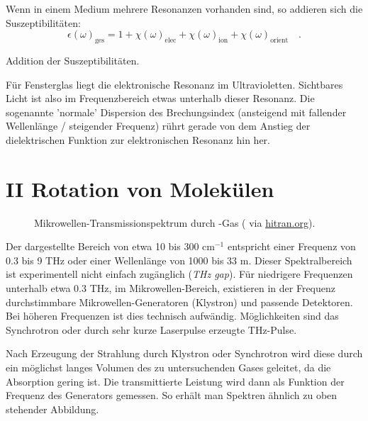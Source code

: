 Wenn in einem Medium mehrere Resonanzen vorhanden sind, so addieren sich die Suszeptibilitäten:
\begin{equation}
\epsilon(\omega)_\text{ges} = 1 + \chi(\omega)_\text{elec} +  \chi(\omega)_\text{ion}  + \chi(\omega)_\text{orient} \quad .
\end{equation}

\begin{marginfigure}

\caption{Addition der Suszeptibilitäten. \label{fig:diel_multiple_lorentz}}
\end{marginfigure}

Für Fensterglas liegt die elektronische Resonanz im Ultravioletten. Sichtbares Licht ist also im Frequenzbereich etwas unterhalb dieser Resonanz. Die sogenannte 'normale' Dispersion des Brechungsindex (ansteigend mit fallender Wellenlänge / steigender Frequenz) rührt gerade von dem Anstieg der dielektrischen Funktion zur elektronischen Resonanz hin her.





\section{II Rotation von Molekülen}




\begin{figure}
\caption{Mikrowellen-Transmissionspektrum durch  -Gas  (\cite{Li_2011_hcl} via \href{https://hitran.org}{hitran.org}).
\label{fig:rot_hcl}}
\end{figure}




Der dargestellte Bereich  von etwa 10 bis 300 cm$^{-1}$ entspricht einer Frequenz von 0.3 bis 9 THz oder einer Wellenlänge von 1000 bis 33 \textmu m. Dieser Spektralbereich ist experimentell nicht einfach zugänglich (\emph{THz gap}). Für niedrigere Frequenzen unterhalb etwa 0.3 THz, im Mikrowellen-Bereich, existieren in der Frequenz durchstimmbare  Mikrowellen-Generatoren (Klystron) und passende Detektoren. Bei höheren Frequenzen ist dies technisch aufwändig. Möglichkeiten sind das Synchrotron oder durch sehr kurze Laserpulse erzeugte THz-Pulse.

Nach Erzeugung der Strahlung durch Klystron oder Synchrotron wird diese durch ein möglichst langes Volumen des zu untersuchenden Gases geleitet, da die Absorption gering ist. Die transmittierte Leistung wird dann als Funktion der Frequenz des Generators gemessen. So erhält man  Spektren ähnlich zu oben stehender Abbildung.

